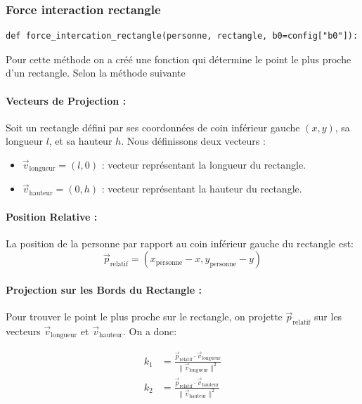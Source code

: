 \documentclass[a4paper,12pt]{article}
\begin{document}
\subsubsection{Force interaction rectangle}

\begin{verbatim}
def force_intercation_rectangle(personne, rectangle, b0=config["b0"]):
\end{verbatim}

Pour cette méthode on a créé une fonction qui détermine le point le plus proche d'un rectangle. Selon la méthode suivante


\paragraph{Vecteurs de Projection :}

Soit un rectangle défini par ses coordonnées de coin inférieur gauche $(x, y)$, sa longueur $l$, et sa hauteur $h$. Nous définissons deux vecteurs :
\begin{itemize}
    \item $\vec{v}_{\text{longueur}} = (l, 0)$ : vecteur représentant la longueur du rectangle.
    \item $\vec{v}_{\text{hauteur}} = (0, h)$ : vecteur représentant la hauteur du rectangle.
\end{itemize}

\paragraph{Position Relative :}

La position de la personne par rapport au coin inférieur gauche du rectangle est:
\[
\vec{p}_{\text{relatif}} = (x_{\text{personne}} - x, y_{\text{personne}} - y)
\]

\paragraph{Projection sur les Bords du Rectangle :}

Pour trouver le point le plus proche sur le rectangle, on projette $\vec{p}_{\text{relatif}}$ sur les vecteurs $\vec{v}_{\text{longueur}}$ et $\vec{v}_{\text{hauteur}}$. On a donc:

\begin{align*}
k_1 &= \frac{\vec{p}_{\text{relatif}} \cdot \vec{v}_{\text{longueur}}}{\|\vec{v}_{\text{longueur}}\|^2} \\
k_2 &= \frac{\vec{p}_{\text{relatif}} \cdot \vec{v}_{\text{hauteur}}}{\|\vec{v}_{\text{hauteur}}\|^2}
\end{align*}
\end{document}
